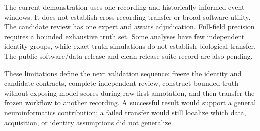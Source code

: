The current demonstration uses one recording and historically informed event
windows. It does not establish cross-recording transfer or broad software utility.
The candidate review has one expert and awaits adjudication. Full-field precision
requires a bounded exhaustive truth set. Some analyses have few independent
identity groups, while exact-truth simulations do not establish biological
transfer. The public software/data release and clean release-suite
record are also pending.

These limitations define the next validation sequence: freeze the identity and
candidate contracts, complete independent review, construct bounded truth without
exposing model scores during raw-first annotation, and then transfer the frozen
workflow to another recording. A successful result would support a general
neuroinformatics contribution; a failed transfer would still localize which
data, acquisition, or identity assumptions did not generalize.

